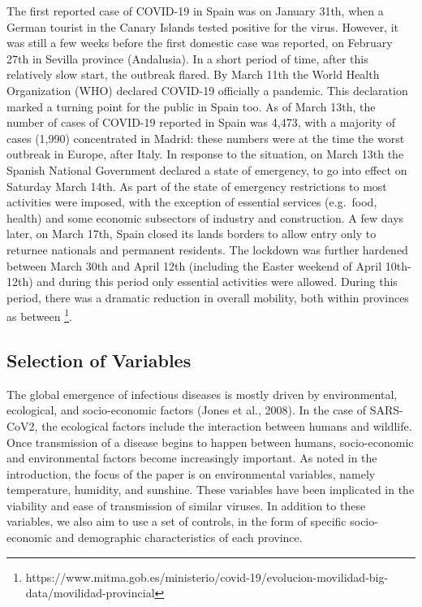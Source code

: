 \documentclass[]{elsarticle} %
\begin{document}
The first reported case of COVID-19 in Spain was on January 31th, when a
German tourist in the Canary Islands tested positive for the virus.
However, it was still a few weeks before the first domestic case was
reported, on February 27th in Sevilla province (Andalusia). In a short
period of time, after this relatively slow start, the outbreak flared.
By March 11th the World Health Organization (WHO) declared COVID-19
officially a pandemic. This declaration marked a turning point for the
public in Spain too. As of March 13th, the number of cases of COVID-19
reported in Spain was 4,473, with a majority of cases (1,990)
concentrated in Madrid: these numbers were at the time the worst
outbreak in Europe, after Italy. In response to the situation, on March
13th the Spanish National Government declared a state of emergency, to
go into effect on Saturday March 14th. As part of the state of emergency
restrictions to most activities were imposed, with the exception of
essential services (e.g.~food, health) and some economic subsectors of
industry and construction. A few days later, on March 17th, Spain closed
its lands borders to allow entry only to returnee nationals and
permanent residents. The lockdown was further hardened between March
30th and April 12th (including the Easter weekend of April 10th-12th)
and during this period only essential activities were allowed. During
this period, there was a dramatic reduction in overall mobility, both
within provinces as between
\footnote{https://www.mitma.gob.es/ministerio/covid-19/evolucion-movilidad-big-data/movilidad-provincial}.

\hypertarget{variables}{%
\subsection{Selection of Variables}\label{variables}}

The global emergence of infectious diseases is mostly driven by
environmental, ecological, and socio-economic factors (Jones et al.,
2008). In the case of SARS-CoV2, the ecological factors include the
interaction between humans and wildlife. Once transmission of a disease
begins to happen between humans, socio-economic and environmental
factors become increasingly important. As noted in the introduction, the
focus of the paper is on environmental variables, namely temperature,
humidity, and sunshine. These variables have been implicated in the
viability and ease of transmission of similar viruses. In addition to
these variables, we also aim to use a set of controls, in the form of
specific socio-economic and demographic characteristics of each
province.
\end{document}
